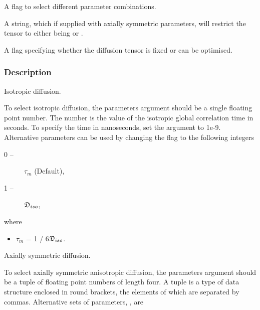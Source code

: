   A flag to select different parameter combinations.

  A string, which if supplied with axially symmetric  parameters, will restrict the tensor to either being 
 or 
.

  A flag specifying whether the diffusion tensor  is fixed or can be optimised. 

\subsubsection{Description}

Isotropic  diffusion.

To select isotropic  diffusion, the parameters argument should be a single floating point 
number.  The number is the value of the isotropic  global correlation time  in seconds.  To
specify the time in nanoseconds, set the 
 argument to 1e-9.  Alternative
parameters can be used by changing the 
 flag to the following integers

\begin{description}
\item[    0 --]   $\tau_m$   (Default),
\item[    1 --]   $\mathfrak{D}_{iso}$,
\end{description}

where

\begin{itemize}
\item[]     $\tau_m$ = 1 / 6$\mathfrak{D}_{iso}$.
\end{itemize}


Axially symmetric  diffusion.

To select axially symmetric  anisotropic  diffusion, the parameters argument should be a tuple
of floating point  numbers of length four.  A tuple is a type of data structure enclosed in
round brackets, the elements of which are separated by commas.  Alternative sets of
parameters, 
, are


